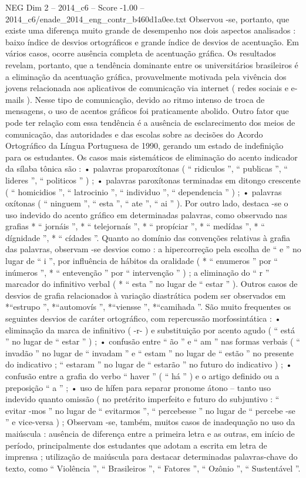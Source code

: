 \begin{textsample}{NEG Dim 2 – 2014\_c6 – Score -1.00 – 2014\_c6/enade\_2014\_eng\_contr\_b460d1a0ee.txt}
Observou -se, portanto, que existe uma diferença muito grande de desempenho nos dois aspectos analisados : baixo índice de desvios ortográficos e grande índice de desvios de acentuação.
Em vários casos, ocorre ausência completa de acentuação gráfica.
Os resultados revelam, portanto, que a tendência dominante entre os universitários brasileiros é a eliminação da acentuação gráfica, provavelmente motivada pela vivência dos jovens relacionada aos aplicativos de comunicação via internet ( redes sociais e e-mails ).
Nesse tipo de comunicação, devido ao ritmo intenso de troca de mensagens, o uso de acentos gráficos foi praticamente abolido.
Outro fator que pode ter relação com essa tendência é a ausência de esclarecimento dos meios de comunicação, das autoridades e das escolas sobre as decisões do Acordo Ortográfico da Língua Portuguesa de 1990, gerando um estado de indefinição para os estudantes.
Os casos mais sistemáticos de eliminação do acento indicador da sílaba tônica são : • palavras proparoxítonas ( “ ridiculos ”, “ publicas ”, “ lideres ”, “ politicos ” ) ; • palavras paroxítonas terminadas em ditongo crescente ( “ homicidios ”, “ latrocinio ”, “ individuo ”, “ dependencia ” ) ; • palavras oxítonas ( “ ninguem ”, “ esta ”, “ ate ”, “ ai ” ).
Por outro lado, destaca -se o uso indevido do acento gráfico em determinadas palavras, como observado nas grafias * “ jornáis ”, * “ telejornaís ”, * “ propíciar ”, * “ medídas ”, * “ dígnidade ”, * “ cídades ”.
Quanto ao domínio das convenções relativas à grafia das palavras, observam -se desvios como : a hipercorreção pela escolha de “ e ” no lugar de “ i ”, por influência de hábitos da oralidade ( * “ enumeros ” por “ inúmeros ”, * “ entevenção ” por “ intervenção ” ) ; a eliminação do “ r ” marcador do infinitivo verbal ( * “ esta ” no lugar de “ estar ” ).
Outros casos de desvios de grafia relacionados à variação diastrática podem ser observados em *“estrupo ”, *“automovís ”, *“viensse ”, *“camihada ”.
São muito frequentes os seguintes desvios de caráter ortográfico, com repercussão morfossintática : • eliminação da marca de infinitivo ( -r- ) e substituição por acento agudo ( “ está ” no lugar de “ estar ” ) ; • confusão entre “ ão ” e “ am ” nas formas verbais ( “ invadão ” no lugar de “ invadam ” e “ estam ” no lugar de “ estão ” no presente do indicativo ; “ estaram ” no lugar de “ estarão ” no futuro do indicativo ) ; • confusão entre a grafia do verbo “ haver ” ( “ há ” ) e o artigo definido ou a preposição “ a ” ; • uso de hífen para separar pronome átono – tanto uso indevido quanto omissão ( no pretérito imperfeito e futuro do subjuntivo : “ evitar -mos ” no lugar de “ evitarmos ”, “ percebesse ” no lugar de “ percebe -se ” e vice-versa ) ; Observam -se, também, muitos casos de inadequação no uso da maiúscula : ausência de diferença entre a primeira letra e as outras, em início de período, principalmente dos estudantes que adotam a escrita em letra de imprensa ; utilização de maiúscula para destacar determinadas palavras-chave do texto, como “ Violência ”, “ Brasileiros ”, “ Fatores ”, “ Ozônio ”, “ Sustentável ”.

\end{textsample}
